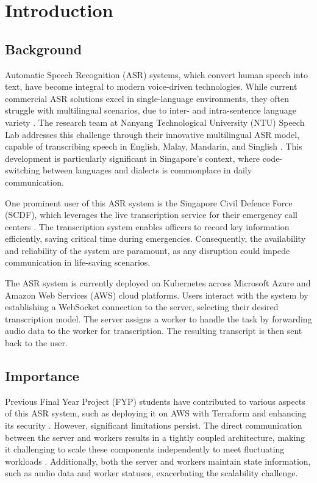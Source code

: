 \chapter{Introduction} \label{chapter:introduction}
\section{Background}

Automatic Speech Recognition (ASR) systems, which convert human speech into text, have become integral to modern voice-driven technologies. While current commercial ASR solutions excel in single-language environments, they often struggle with multilingual scenarios, due to inter- and intra-sentence language variety \cite{code_switching}. The research team at Nanyang Technological University (NTU) Speech Lab addresses this challenge through their innovative multilingual ASR model, capable of transcribing speech in English, Malay, Mandarin, and Singlish \cite{speech_lab,scdf_2}. This development is particularly significant in Singapore's context, where code-switching between languages and dialects is commonplace in daily communication.

One prominent user of this ASR system is the Singapore Civil Defence Force (SCDF), which leverages the live transcription service for their emergency call centers \cite{scdf}. The transcription system enables officers to record key information efficiently, saving critical time during emergencies. Consequently, the availability and reliability of the system are paramount, as any disruption could impede communication in life-saving scenarios.

The ASR system is currently deployed on Kubernetes across Microsoft Azure and Amazon Web Services (AWS) cloud platforms. Users interact with the system by establishing a WebSocket connection to the server, selecting their desired transcription model. The server assigns a worker to handle the task by forwarding audio data to the worker for transcription. The resulting transcript is then sent back to the user.

\section{Importance}
Previous Final Year Project (FYP) students have contributed to various aspects of this ASR system, such as deploying it on AWS with Terraform \cite{song_yu, kai_shern} and enhancing its security \cite{putra}. However, significant limitations persist. The direct communication between the server and workers results in a tightly coupled architecture, making it challenging to scale these components independently to meet fluctuating workloads \cite{tight_couple}. Additionally, both the server and workers maintain state information, such as audio data and worker statuses, exacerbating the scalability challenge.

